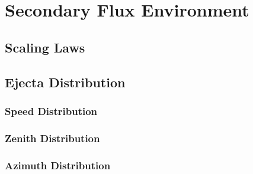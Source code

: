 \documentclass{article}
\begin{document}
\section{Secondary Flux Environment}

\subsection{Scaling Laws}



\subsection{Ejecta Distribution}


\subsubsection{Speed Distribution}



\subsubsection{Zenith Distribution}


\subsubsection{Azimuth Distribution}
\end{document}
